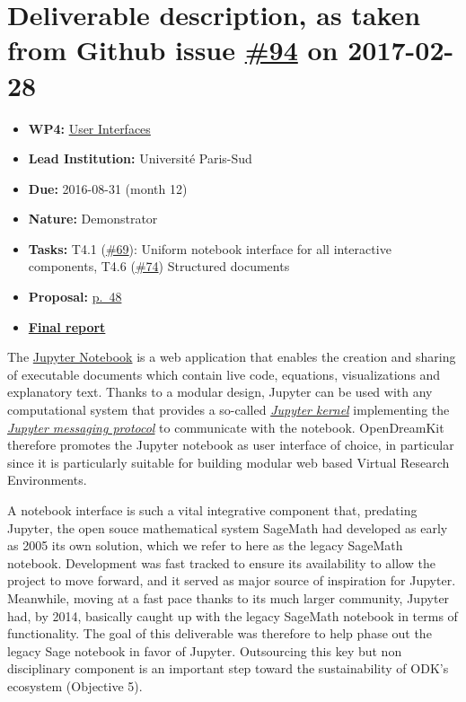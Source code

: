 \section*{\texorpdfstring{Deliverable description, as taken from Github
issue
\href{https://github.com/OpenDreamKit/OpenDreamKit/issues/94}{\#94} on
2017-02-28}{Deliverable description, as taken from Github issue \#94 on 2017-02-28}}\label{deliverable-description-as-taken-from-github-issue-94-on-2017-02-28}

\begin{itemize}
\tightlist
\item
  \textbf{WP4:}
  \href{https://github.com/OpenDreamKit/OpenDreamKit/tree/master/WP4}{User
  Interfaces}
\item
  \textbf{Lead Institution:} Université Paris-Sud
\item
  \textbf{Due:} 2016-08-31 (month 12)
\item
  \textbf{Nature:} Demonstrator
\item
  \textbf{Tasks:} T4.1
  (\href{https://github.com/OpenDreamKit/OpenDreamKit/issues/69}{\#69}):
  Uniform notebook interface for all interactive components, T4.6
  (\href{https://github.com/OpenDreamKit/OpenDreamKit/issues/74}{\#74})
  Structured documents
\item
  \textbf{Proposal:}
  \href{https://github.com/OpenDreamKit/OpenDreamKit/raw/master/Proposal/proposal-www.pdf}{p.~48}
\item
  \textbf{\href{https://github.com/OpenDreamKit/OpenDreamKit/raw/master/WP4/D4.5/report-final.pdf}{Final
  report}}
\end{itemize}

The \href{https://jupyter.org}{Jupyter Notebook} is a web application
that enables the creation and sharing of executable documents which
contain live code, equations, visualizations and explanatory text.
Thanks to a modular design, Jupyter can be used with any computational
system that provides a so-called
\href{https://jupyter.readthedocs.io/en/latest/projects/kernels.html}{\emph{Jupyter
kernel}} implementing the
\href{https://jupyter-client.readthedocs.io/en/latest/}{\emph{Jupyter
messaging protocol}} to communicate with the notebook. OpenDreamKit
therefore promotes the Jupyter notebook as user interface of choice, in
particular since it is particularly suitable for building modular web
based Virtual Research Environments.

A notebook interface is such a vital integrative component that,
predating Jupyter, the open souce mathematical system SageMath had
developed as early as 2005 its own solution, which we refer to here as
the legacy SageMath notebook. Development was fast tracked to ensure its
availability to allow the project to move forward, and it served as
major source of inspiration for Jupyter. Meanwhile, moving at a fast
pace thanks to its much larger community, Jupyter had, by 2014,
basically caught up with the legacy SageMath notebook in terms of
functionality. The goal of this deliverable was therefore to help phase
out the legacy Sage notebook in favor of Jupyter. Outsourcing this key
but non disciplinary component is an important step toward the
sustainability of ODK's ecosystem (Objective 5).

